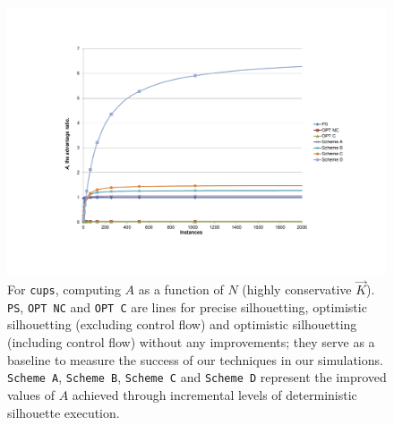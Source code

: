 \begin{figure}[h]
  \center
  \includegraphics[scale=0.80, trim=5cm 3cm 0cm 3cm]{cups-1.pdf}
  \caption[For \texttt{cups}, $A$ as a function of $N$ (highly conservative $\vec K$)]%
          {
            For \texttt{cups}, computing $A$ as a function of $N$ (highly conservative $\vec K$).\newline
            \texttt{PS}, \texttt{OPT NC} and \texttt{OPT C} are lines for precise silhouetting, optimistic 
            silhouetting (excluding control flow) and optimistic silhouetting
            (including control flow) without any improvements; they
            serve as a baseline to measure the success of our techniques
            in our simulations. \texttt{Scheme A}, \texttt{Scheme B}, \texttt{Scheme C} and
            \texttt{Scheme D} represent the improved values of $A$
            achieved through incremental levels of deterministic silhouette execution.
          }
  \label{cups1}
\end{figure}

